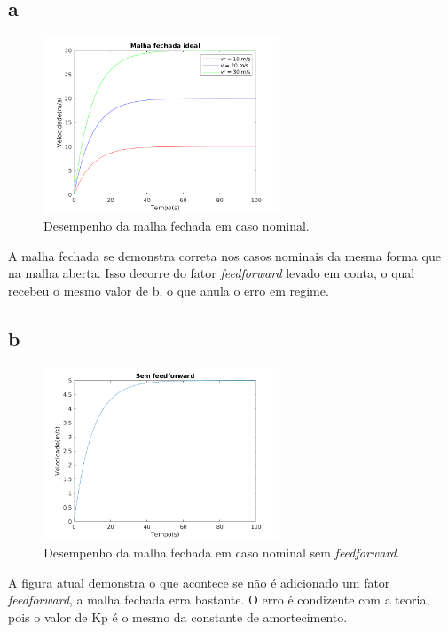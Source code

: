 \documentclass{article}[twocolumn]
\begin{document}
	\subsection{a}
	\begin{figure}[H]
		\centering
		\includegraphics[width=7cm]{3a.png}
		\caption{Desempenho da malha fechada em caso nominal.}
	\end{figure}
	A malha fechada se demonstra correta nos casos nominais da mesma forma que na malha
	aberta. Isso decorre do fator \textit{feedforward} levado em conta, o qual recebeu o
	mesmo valor de b, o que anula o erro em regime.
	\subsection{b}
	\begin{figure}[H]
		\centering
		\includegraphics[width=7cm]{3b.png}
		\caption{Desempenho da malha fechada em caso nominal sem \textit{feedforward}.}
	\end{figure}
	A figura atual demonstra o que acontece se n\~ao \'e adicionado um fator
	\textit{feedforward}, a malha fechada erra bastante. O erro \'e condizente com a teoria,
	pois o valor de Kp \'e o mesmo da constante de amortecimento.
\end{document}
